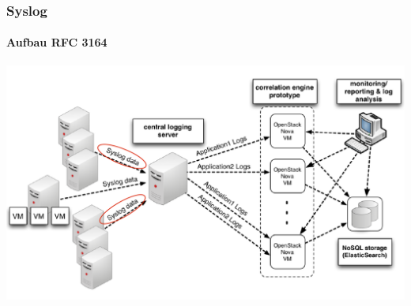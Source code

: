 \documentclass[10pt]{beamer} %
\begin{document}
\begin{frame}
\frametitle{Syslog}
\framesubtitle{Aufbau RFC 3164}
\includegraphics[scale=0.25]{img/schema-correlat-01.png}
\end{frame}
\end{document}
